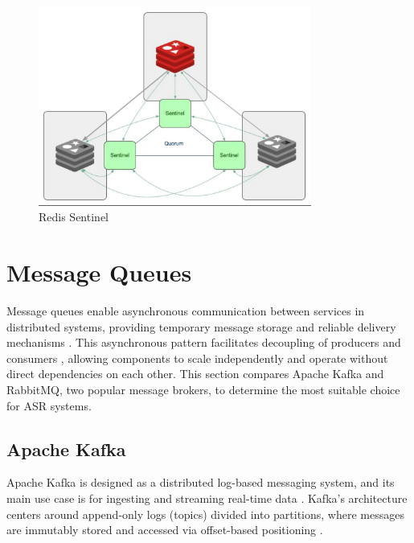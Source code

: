 \begin{figure}[H]
    \centering
    \includegraphics[width=0.8\textwidth]{figures/redis_sentinel.png}
    \caption{Redis Sentinel}
    \label{fig:redis_sentinel}
\end{figure}

\section{Message Queues}
Message queues enable asynchronous communication between services in distributed systems, providing temporary message storage and reliable delivery mechanisms \cite{queue_definition}. This asynchronous pattern facilitates decoupling of producers and consumers \cite{queue_decouple}, allowing components to scale independently and operate without direct dependencies on each other. This section compares Apache Kafka and RabbitMQ, two popular message brokers, to determine the most suitable choice for ASR systems.
\subsection{Apache Kafka}
Apache Kafka is designed as a distributed log-based messaging system, and its main use case is for ingesting and streaming real-time data \cite{kafka_definition}. Kafka's architecture centers around append-only logs (topics) divided into partitions, where messages are immutably stored and accessed via offset-based positioning \cite{kafka_documentation}.

